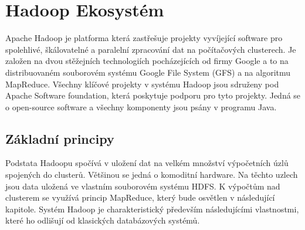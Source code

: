 \documentclass[thesis=M,czech]{FITthesis}[2012/06/26]
\begin{document}
\section{Hadoop Ekosystém}
Apache Hadoop je platforma která zastřešuje projekty vyvíjející software pro spolehlivé, škálovatelné a paralelní zpracování dat na počítačových clusterech. Je založen na dvou stěžejních technologiích pocházejících od firmy Google  a to na distribuovaném souborovém systému Google File System (GFS)\cite{GFS} a na algoritmu MapReduce\cite{HadoopDum}. Všechny klíčové projekty v systému Hadoop jsou sdruženy pod Apache Software foundation, která poskytuje podporu pro tyto projekty. Jedná se o open-source software a všechny komponenty jsou psány v programu Java.

\subsection{Základní principy}
Podstata Hadoopu spočívá v uložení dat na velkém množství výpočetních úzlů spojených do clusterů. Většinou se jedná o komoditní hardware. Na těchto uzlech jsou data uložená ve vlastním souborovém systému HDFS. K výpočtům nad clusterem se využívá princip MapReduce, který bude osvětlen v následující kapitole. Systém Hadoop je charakteristický především následujícími vlastnostmi, které ho odlišují od klasických databázových systémů.
\end{document}
